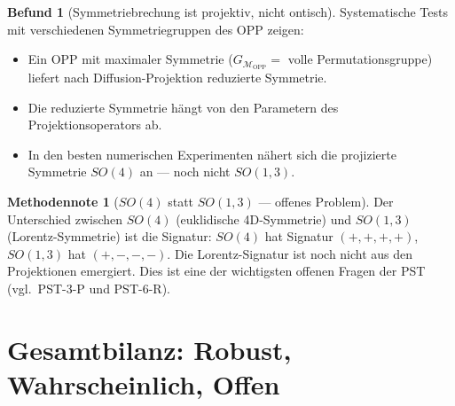 \documentclass[11pt,a4paper]{article}
\theoremstyle{plain}
\theoremstyle{definition}
\newtheorem{methodennote}{Methodennote}[section]
\newtheorem{befund}{Befund}[section]
\newcommand{\OPP}{\mathcal{M}_{\mathrm{OPP}}}
\begin{document}
\begin{befund}[Symmetriebrechung ist projektiv, nicht ontisch]
Systematische Tests mit verschiedenen Symmetriegruppen des OPP zeigen:
\begin{itemize}
  \item Ein OPP mit maximaler Symmetrie ($G_{\OPP} = $ volle
        Permutationsgruppe) liefert nach Diffusion-Projektion
        reduzierte Symmetrie.
  \item Die reduzierte Symmetrie h\"{a}ngt von den Parametern des
        Projektionsoperators ab.
  \item In den besten numerischen Experimenten n\"{a}hert sich die
        projizierte Symmetrie $SO(4)$ an --- noch nicht $SO(1,3)$.
\end{itemize}
\end{befund}

\begin{methodennote}[$SO(4)$ statt $SO(1,3)$ --- offenes Problem]
Der Unterschied zwischen $SO(4)$ (euklidische 4D-Symmetrie) und
$SO(1,3)$ (Lorentz-Symmetrie) ist die Signatur: $SO(4)$ hat Signatur
$(+,+,+,+)$, $SO(1,3)$ hat $(+,-,-,-)$. Die Lorentz-Signatur ist noch
nicht aus den Projektionen emergiert. Dies ist eine der wichtigsten
offenen Fragen der PST (vgl.\ PST-3-P und PST-6-R).
\end{methodennote}

\section{Gesamtbilanz: Robust, Wahrscheinlich, Offen}
\end{document}
